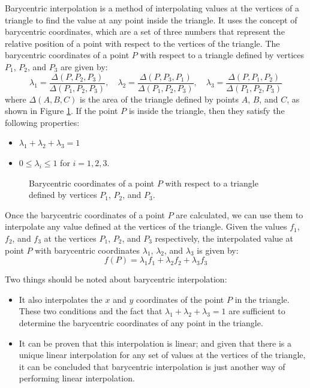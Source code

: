 Barycentric interpolation is a method of interpolating values at the vertices of a triangle to find the value at any point inside the triangle. It uses the concept of barycentric coordinates, which are a set of three numbers that represent the relative position of a point with respect to the vertices of the triangle. The barycentric coordinates of a point $P$ with respect to a triangle defined by vertices $P_1$, $P_2$, and $P_3$ are given by:
\[\lambda_1 = \frac{\Delta(P, P_2, P_3)}{\Delta(P_1, P_2, P_3)}, \quad \lambda_2 = \frac{\Delta(P, P_3, P_1)}{\Delta(P_1, P_2, P_3)}, \quad \lambda_3 = \frac{\Delta(P, P_1, P_2)}{\Delta(P_1, P_2, P_3)}\]
where $\Delta(A, B, C)$ is the area of the triangle defined by points $A$, $B$, and $C$, as shown in Figure \ref{fig:barycentric}. If the point $P$ is inside the triangle, then they satisfy the following properties:
\begin{itemize}
    \item $\lambda_1 + \lambda_2 + \lambda_3 = 1$
    \item $0 \leq \lambda_i \leq 1$ for $i = 1, 2, 3$.
\end{itemize}
\begin{figure}
    \centering
    \caption{\centering Barycentric coordinates of a point $P$ with respect to a triangle defined by vertices $P_1$, $P_2$, and $P_3$.}
    \label{fig:barycentric}
\end{figure}

Once the barycentric coordinates of a point $P$ are calculated, we can use them to interpolate any value defined at the vertices of the triangle. Given the values $f_1$, $f_2$, and $f_3$ at the vertices $P_1$, $P_2$, and $P_3$ respectively, the interpolated value at point $P$ with barycentric coordinates $\lambda_1$, $\lambda_2$, and $\lambda_3$ is given by:
\[f(P) = \lambda_1 f_1 + \lambda_2 f_2 + \lambda_3 f_3\]

Two things should be noted about barycentric interpolation:
\begin{itemize}
    \item It also interpolates the $x$ and $y$ coordinates of the point $P$ in the triangle. These two conditions and the fact that $\lambda_1 + \lambda_2 + \lambda_3 = 1$ are sufficient to determine the barycentric coordinates of any point in the triangle.
    \item It can be proven that this interpolation is linear; and given that there is a unique linear interpolation for any set of values at the vertices of the triangle, it can be concluded that barycentric interpolation is just another way of performing linear interpolation.
\end{itemize}


